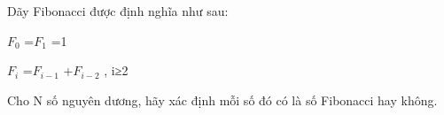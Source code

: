 Dãy Fibonacci được định nghĩa như sau:  

   $F_{0}$   =$F_{1}$   =1  

   $F_{i}$   =$F_{i-1}$   +$F_{i-2}$   ­, i≥2  

   Cho N số nguyên dương, hãy xác định mỗi số đó có là số Fibonacci hay không.